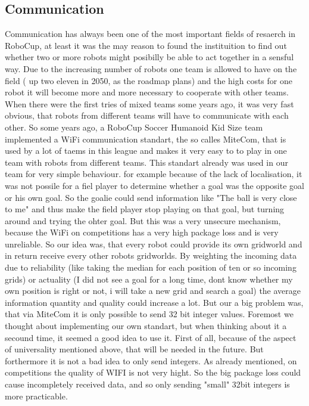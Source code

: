 \documentclass[lnicst,a4paper]{svmultln}
\begin{document}

\subsection{Communication}
Communication has always been one of the most important fields of resaerch in RoboCup, at least it was the may reason to found the instituition to find out whether two or more robots might posibilly be able to act together in a sensful way. 
Due to the increasing number of robots one team is allowed to have on the field ( up two eleven in 2050, as the roadmap plans) and the high costs for one robot it will become more and more necessary to cooperate with other teams. When there were the first tries of mixed teams some years ago, it was very fast obvious, that robots from different teams will have to communicate with each other.
So some years ago, a RoboCup Soccer Humanoid Kid Size team implemented a WiFi communication standart, the so calles MiteCom,  that is used by a lot of taems in this league and makes it very easy to to play in one team with robots from different teams.
This standart already was used in our team for very simple behaviour. for example because of the lack of localisation, it was not possile for a fiel player to determine whether a goal was the opposite goal or his own goal. So the goalie could send information like "The ball is very close to me" and thus make the field player stop playing on that goal, but turning around and trying the ohter goal. But this was a very unsecure mechanism, because the WiFi on competitions has a very high package loss and is very unreliable. 
So our idea was, that every robot could provide its own gridworld and in return receive every other robots gridworlds. By weighting the incoming data due to reliability (like taking the median for each position of ten or so incoming grids) or actuality (I did not see a goal for a long time, dont know whether my own position is right or not, i will take a new grid and search a goal) the average information quantity and quality could increase a lot.
But our a big problem was, that via MiteCom it is only possible to send 32 bit integer values. Foremost we thought about implementing our own standart, but when thinking about it a secound time, it seemed a good idea to use it. First of all, because of the aspect of universality mentioned above, that will be needed in the future. But forthermore it is not a bad idea to only send integers. 
As already mentioned, on competitions the quality of WIFI is not very hight. So the big package loss could cause incompletely received data, and so only sending "small" 32bit integers is more practicable. 
\end{document}
